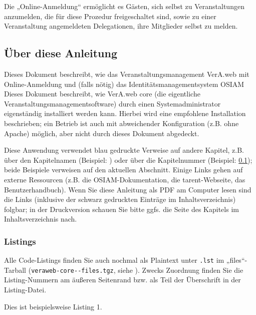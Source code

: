 \ifoa
Die „Online-Anmeldung“ ermöglicht es Gästen, sich selbst zu Veranstaltungen
anzumelden, die für diese Prozedur freigeschaltet sind, sowie zu einer
Veranstaltung angemeldeten Delegationen, ihre Mitglieder selbst zu melden.
\fi%

\subsection{Über diese Anleitung}\label{subsec:aboutmanual}

\ifoa
Dieses Dokument beschreibt, wie das Veranstaltungsmanagement
VerA.web mit Online-Anmeldung und (falls nötig) das
Identitätsmanagementsystem OSIAM
\else%
Dieses Dokument beschreibt, wie VerA.web core (die eigentliche
Veranstaltungsmanagementsoftware)
\fi%
durch einen Systemadministrator
eigenständig installiert werden kann. Hierbei wird eine empfohlene
Installation beschrieben; ein Betrieb ist auch mit abweichender
Konfiguration (z.B. ohne Apache) möglich, aber nicht durch dieses
Dokument abgedeckt.

Diese Anwendung verwendet blau gedruckte Verweise auf andere Kapitel,
z.B. über den Kapitelnamen (Beispiel: )
oder über die Kapitelnummer (Beispiel: \ref{subsec:aboutmanual});
beide Beispiele verweisen auf den aktuellen Abschnitt. Einige Links
gehen auf externe Ressourcen (z.B. die OSIAM-Dokumentation, die
tarent-Webseite, das Benutzerhandbuch). Wenn Sie diese Anleitung als
PDF am Computer lesen sind die Links (inklusive der schwarz gedruckten
Einträge im Inhaltsverzeichnis) folgbar; in der Druckversion schauen
Sie bitte ggfs. die Seite des Kapitels im Inhaltsverzeichnis nach.

\subsubsection{Listings}\label{subsubsec:aboutmanual-lst}

\begin{minipage}{\linewidth}
Alle Code-Listings finden Sie auch nochmal als Plaintext unter
\texttt{\jobname.lst} im „files“-Tarball
(\texttt{veraweb-core-\vwiaverssw{}-files.tgz}, siehe
).
Zwecks Zuordnung finden Sie die Listing-Nummern am äußeren
Seitenrand bzw. als Teil der Überschrift in der Listing-Datei.

\begin{lstdumpx}
Dies ist beispielsweise Listing 1.
\end{lstdumpx}
\end{minipage}

